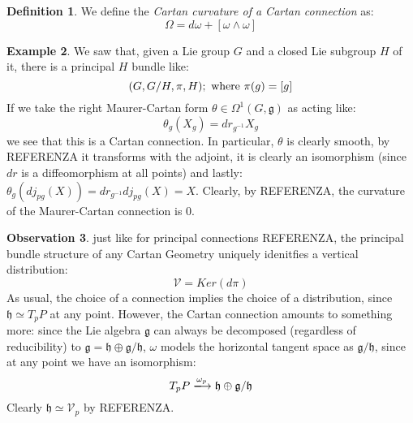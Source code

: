 \documentclass[12pt,a4paper]{report}
\theoremstyle{definition}
\newtheorem{Def}{Definition}[chapter]
\theoremstyle{Theorem}
\theoremstyle{definition}
\newtheorem{Ex}[Def]{Example}
\theoremstyle{definition}
\newtheorem{Obs}[Def]{Observation}
\begin{document}
		\begin{Def}
			We define the \textit{Cartan curvature of a Cartan connection} as:
			$$\Omega=d\omega+[\omega\wedge \omega]$$
		\end{Def}
		\begin{Ex}
			We saw that, given a Lie group $G$ and a closed Lie subgroup $H$ of it, there is a principal $H$ bundle like:
			$$(G,G/H,\pi,H); \hbox{ where }\pi(g)=[g]$$
			If we take the right Maurer-Cartan form $\theta\in\Omega^1(G,\mathfrak{g})$ as acting like:
			$$\theta_g(X_g)=dr_{g^{-1}}X_g$$
			we see that this is a Cartan connection. In particular, $\theta$ is clearly smooth, by REFERENZA it transforms with the adjoint, it is clearly an isomorphism (since $dr$ is a diffeomorphism at all points) and lastly:
			$\theta_g(dj_{pg}(X))=dr_{g^{-1}}dj_{pg}(X)=X$. Clearly, by REFERENZA, the curvature of the Maurer-Cartan connection is 0.
		\end{Ex}
	\begin{Obs}
		just like for principal connections REFERENZA, the principal bundle structure of any Cartan Geometry uniquely idenitfies a vertical distribution:
		$$\mathcal{V}=Ker(d\pi)$$
		As usual, the choice of a connection implies the choice of a distribution, since $\mathfrak{h}\simeq T_pP$ at any point. However, the Cartan connection amounts to something more: since the Lie algebra $\mathfrak{g}$ can always be decomposed (regardless of reducibility) to $\mathfrak{g}=\mathfrak{h}\oplus\mathfrak{g/h}$, $\omega$ models the horizontal tangent space as $\mathfrak{g/h}$, since at any point we have an isomorphism:
		$$T_pP\xlongrightarrow{\omega_p}\mathfrak{h}\oplus\mathfrak{g/h}$$
		Clearly $\mathfrak{h}\simeq\mathcal{V}_p$ by REFERENZA.
	\end{Obs}
\end{document}
